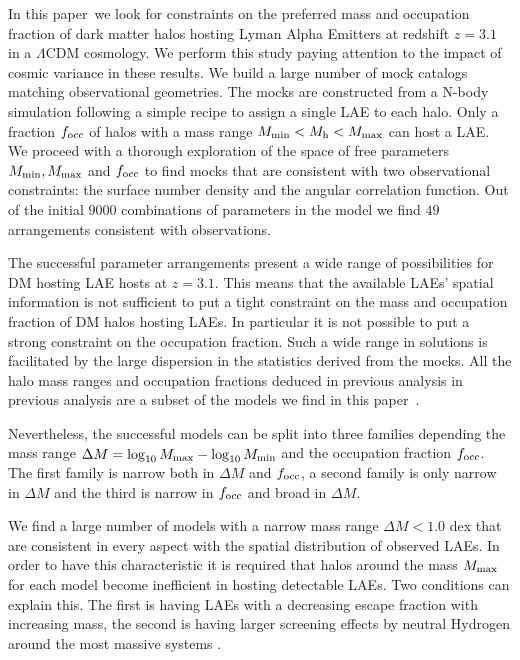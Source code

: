 \documentclass[usenatbib]{mn2e}
\newcommand{\documentname}{paper~}
\newcommand{\ly}{{\ifmmode{{\rm Ly}\alpha}\else{Ly$\alpha$~}\fi}}
\begin{document}
In this \documentname we look for constraints on the preferred mass
and occupation fraction of dark matter halos hosting Lyman Alpha Emitters at
redshift $z=3.1$ in a $\Lambda$CDM cosmology. We perform this study
paying attention to the impact of cosmic variance in these results. We
build a large number of mock catalogs matching observational
geometries. The mocks are constructed from a N-body simulation
following a simple recipe to assign a single LAE to each halo. Only
a fraction $f_{\rm occ}$ of halos with a mass range  $M_{\rm
  min}<M_{\rm h}<M_{\rm   max}$ can host a LAE. We proceed with a
thorough exploration of the space of free parameters $M_{\rm min},
M_{\rm max}$ and $f_{\rm occ}$ to find mocks that are consistent with
two observational constraints: the surface number density and the
angular correlation function. Out of the initial $9000$ 
combinations of parameters in the model we find $49$ arrangements
consistent with observations.


The successful parameter arrangements present a wide range of possibilities for
DM hosting LAE hosts at $z=3.1$. This means that the available LAEs' spatial
information is not sufficient to put a tight constraint on the mass
and occupation fraction of DM halos hosting LAEs. In particular it is
not possible to put a strong constraint on the occupation
fraction. Such a wide range in solutions is facilitated by the large
dispersion in the statistics derived from the mocks. All the halo mass
ranges and occupation fractions deduced in previous analysis in
previous analysis \citep[i.e.][]{Gawiser2007,Ouchi2010} are a subset of the
models we find in this \documentname.  
 

Nevertheless, the successful models can be split into three families
depending the mass range $\Delta M=\log_{10}M_{\rm max} -
\log_{10}M_{\rm min}$ and the occupation fraction $f_{\rm occ}$. The
first family is narrow both in $\Delta M$ and $f_{\rm occ}$, a second
family is only narrow in $\Delta M$ and the third is narrow in $f_{\rm
  occ}$ and broad in $\Delta M$. 

 
We find a large number of models with a narrow mass range
$\Delta M<1.0$ dex that are consistent in every aspect with the
spatial distribution of observed LAEs. In order to have this characteristic
it is required that halos around the mass $M_{\rm   max}$ for each
model become inefficient in hosting detectable LAEs. Two conditions
can explain this. The first is having LAEs with a decreasing \ly
escape fraction with increasing mass, the second is having larger screening
effects by neutral Hydrogen around the most massive systems
\citep{Laursen2009,ForeroRomero2011}.  
\end{document}
